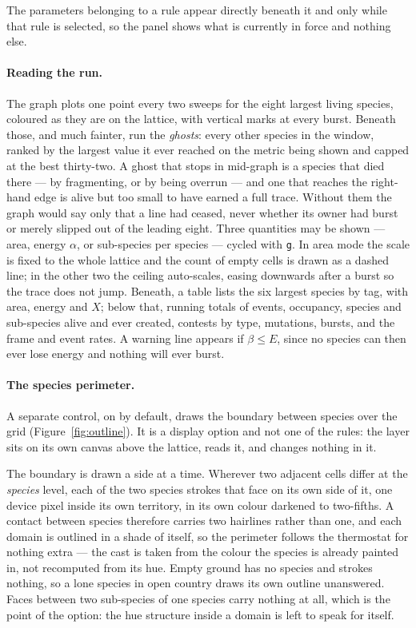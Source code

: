 \documentclass[11pt,a4paper]{article}
\newcommand{\code}[1]{\texttt{#1}}
\begin{document}
\noindent
The parameters belonging to a rule appear directly beneath it and only while that rule is
selected, so the panel shows what is currently in force and nothing else.

\paragraph{Reading the run.} The graph plots one point every two sweeps for the eight
largest living species, coloured as they are on the lattice, with vertical marks at every
burst. Beneath those, and much fainter, run the \emph{ghosts}: every other species in the
window, ranked by the largest value it ever reached on the metric being shown and capped at
the best thirty-two. A ghost that stops in mid-graph is a species that died there --- by
fragmenting, or by being overrun --- and one that reaches the right-hand edge is alive but
too small to have earned a full trace. Without them the graph would say only that a line had
ceased, never whether its owner had burst or merely slipped out of the leading eight. Three quantities may be shown --- area, energy $\alpha$, or sub-species per
species --- cycled with \code{g}. In area mode the scale is fixed to the whole lattice and
the count of empty cells is drawn as a dashed line; in the other two the ceiling
auto-scales, easing downwards after a burst so the trace does not jump. Beneath, a table
lists the six largest species by tag, with area, energy and $X$; below that, running
totals of events, occupancy, species and sub-species alive and ever created, contests by
type, mutations, bursts, and the frame and event rates. A warning line appears if
$\beta \le E$, since no species can then ever lose energy and nothing will ever burst.

\paragraph{The species perimeter.} A separate control, on by default, draws the boundary
between species over the grid (Figure~\ref{fig:outline}). It is a display option and not one
of the rules: the layer sits on its own canvas above the lattice, reads it, and changes
nothing in it.

The boundary is drawn a side at a time. Wherever two adjacent cells differ at the
\emph{species} level, each of the two species strokes that face on its own side of it, one
device pixel inside its own territory, in its own colour darkened to two-fifths. A contact
between species therefore carries two hairlines rather than one, and each domain is outlined
in a shade of itself, so the perimeter follows the thermostat for nothing extra --- the cast
is taken from the colour the species is already painted in, not recomputed from its hue.
Empty ground has no species and strokes nothing, so a lone species in open country draws its
own outline unanswered. Faces between two sub-species of one species carry nothing at all,
which is the point of the option: the hue structure inside a domain is left to speak for
itself.
\end{document}
